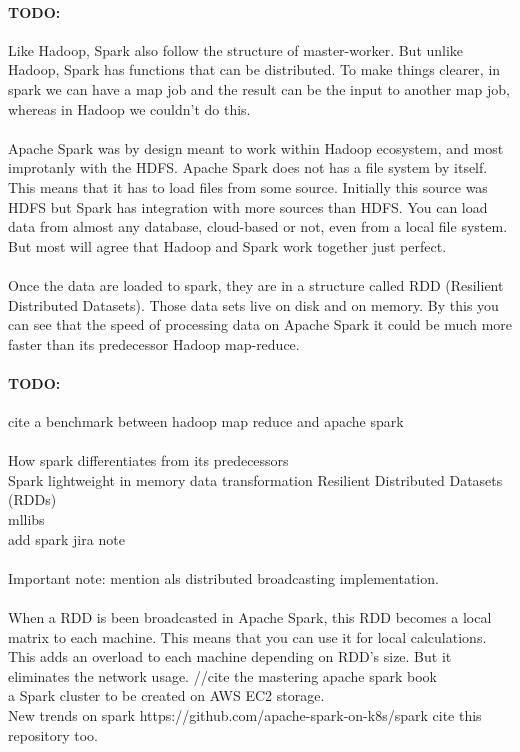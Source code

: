 \paragraph{TODO:} Like Hadoop, Spark also follow the structure of master-worker. But unlike Hadoop, Spark has functions that can be distributed. To make things clearer, in spark we can have a map job and the result can be the input to another map job, whereas in Hadoop we couldn't do this.

\paragraph{}
Apache Spark was by design meant to work within Hadoop ecosystem, and most improtanly with the HDFS. Apache Spark does not has a file system by itself. This means that it has to load files from some source. Initially this source was HDFS but Spark has integration with more sources than HDFS. You can load data from almost any database, cloud-based or not, even from a local file system. But most will agree that Hadoop and Spark work together just perfect.

\paragraph{} Once the data are loaded to spark, they are in a structure called RDD (Resilient Distributed Datasets). Those data sets live on disk and on memory. By this you can see that the speed of processing data on Apache Spark it could be much more faster than its predecessor Hadoop map-reduce. 

\paragraph{TODO:} cite a benchmark between hadoop map reduce and apache spark

\paragraph{}
How spark differentiates from its predecessors\\
Spark lightweight in memory data transformation 
Resilient Distributed Datasets (RDDs) \\
mllibs\\
add spark jira note \\\\
Important note: mention als distributed broadcasting implementation. 
\\\\
When a RDD is been broadcasted in Apache Spark, this RDD becomes a local matrix to each machine. This means that you can use it for local calculations. This adds an overload to each machine depending on RDD's size. But it eliminates the network usage.
//cite the mastering apache spark book
\cite{ApacheSpark:1} \\
a Spark cluster to be created on AWS EC2 storage.\\
New trends on spark https://github.com/apache-spark-on-k8s/spark cite this repository too.
